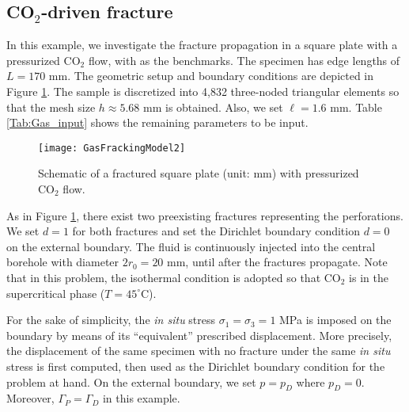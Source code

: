 \subsection{{CO$_2$-driven fracture}} \label{sec: co2_propagation_ex}
In this example, we investigate the fracture propagation in a square plate with a pressurized CO$_2$ flow, with \cite{ishida2016features, wang2018influence} as the benchmarks. The specimen has edge lengths of $L=170$ mm. The geometric setup and boundary conditions are depicted in Figure \ref{Fig:Gas_geometry}. The sample is discretized into 4,832 three-noded triangular elements so that the mesh size $h\approx 5.68$ mm is obtained. Also, we set $\ell=1.6$ mm. Table \ref{Tab:Gas_input} shows the remaining parameters to be input.

\begin{figure}[htbp]
	\centering
	\texttt{[image: GasFrackingModel2]}
	\caption{Schematic of a fractured square plate (unit: mm) with pressurized CO$_2$ flow.}
	\label{Fig:Gas_geometry}
\end{figure}

As in Figure \ref{Fig:Gas_geometry}, there exist two preexisting fractures representing the perforations. We set $d=1$ for both fractures and set the Dirichlet boundary condition $d=0$ on the external boundary. The fluid is continuously injected into the central borehole with diameter $2r_0=20$ mm, until after the fractures propagate. Note that in this problem, the isothermal condition is adopted so that CO$_2$ is in the supercritical phase ($T=45^{\circ}$C).

For the sake of simplicity, the \emph{in situ} stress {$\sigma_1=\sigma_3=1$ MPa} is imposed on the boundary by means of its ``equivalent'' prescribed displacement. More precisely, the displacement of the same specimen with no fracture under the same \emph{in situ} stress is first computed, then used as the Dirichlet boundary condition for the problem at hand. On the external boundary, we set $p=p_D$ where $p_D=0$. Moreover, $\Gamma_P=\Gamma_D$ in this example.



